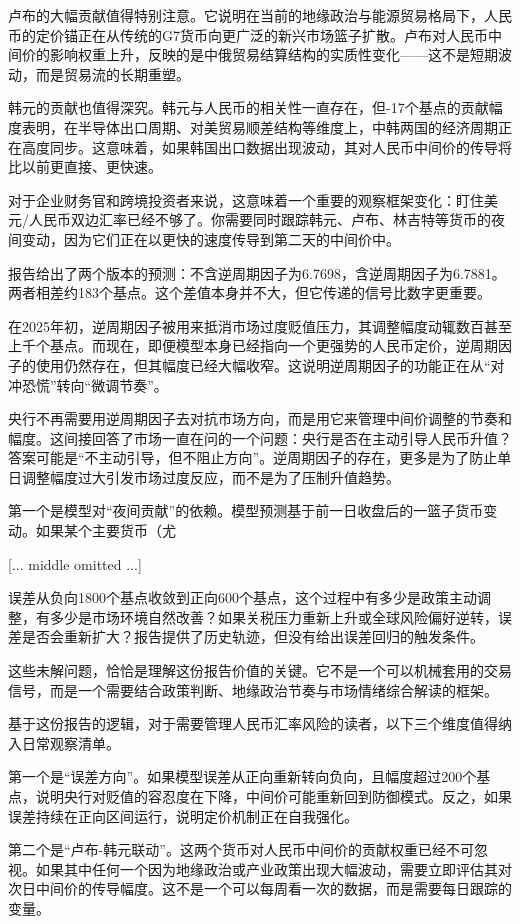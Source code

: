 \documentclass[11pt]{ctexart}
\begin{document}
卢布的大幅贡献值得特别注意。它说明在当前的地缘政治与能源贸易格局下，人民币的定价锚正在从传统的G7货币向更广泛的新兴市场篮子扩散。卢布对人民币中间价的影响权重上升，反映的是中俄贸易结算结构的实质性变化——这不是短期波动，而是贸易流的长期重塑。

韩元的贡献也值得深究。韩元与人民币的相关性一直存在，但-17个基点的贡献幅度表明，在半导体出口周期、对美贸易顺差结构等维度上，中韩两国的经济周期正在高度同步。这意味着，如果韩国出口数据出现波动，其对人民币中间价的传导将比以前更直接、更快速。

对于企业财务官和跨境投资者来说，这意味着一个重要的观察框架变化：盯住美元/人民币双边汇率已经不够了。你需要同时跟踪韩元、卢布、林吉特等货币的夜间变动，因为它们正在以更快的速度传导到第二天的中间价中。

报告给出了两个版本的预测：不含逆周期因子为6.7698，含逆周期因子为6.7881。两者相差约183个基点。这个差值本身并不大，但它传递的信号比数字更重要。

在2025年初，逆周期因子被用来抵消市场过度贬值压力，其调整幅度动辄数百甚至上千个基点。而现在，即便模型本身已经指向一个更强势的人民币定价，逆周期因子的使用仍然存在，但其幅度已经大幅收窄。这说明逆周期因子的功能正在从“对冲恐慌”转向“微调节奏”。

央行不再需要用逆周期因子去对抗市场方向，而是用它来管理中间价调整的节奏和幅度。这间接回答了市场一直在问的一个问题：央行是否在主动引导人民币升值？答案可能是“不主动引导，但不阻止方向”。逆周期因子的存在，更多是为了防止单日调整幅度过大引发市场过度反应，而不是为了压制升值趋势。

第一个是模型对“夜间贡献”的依赖。模型预测基于前一日收盘后的一篮子货币变动。如果某个主要货币（尤

[... middle omitted ...]

误差从负向1800个基点收敛到正向600个基点，这个过程中有多少是政策主动调整，有多少是市场环境自然改善？如果关税压力重新上升或全球风险偏好逆转，误差是否会重新扩大？报告提供了历史轨迹，但没有给出误差回归的触发条件。

这些未解问题，恰恰是理解这份报告价值的关键。它不是一个可以机械套用的交易信号，而是一个需要结合政策判断、地缘政治节奏与市场情绪综合解读的框架。

基于这份报告的逻辑，对于需要管理人民币汇率风险的读者，以下三个维度值得纳入日常观察清单。

第一个是“误差方向”。如果模型误差从正向重新转向负向，且幅度超过200个基点，说明央行对贬值的容忍度在下降，中间价可能重新回到防御模式。反之，如果误差持续在正向区间运行，说明定价机制正在自我强化。

第二个是“卢布-韩元联动”。这两个货币对人民币中间价的贡献权重已经不可忽视。如果其中任何一个因为地缘政治或产业政策出现大幅波动，需要立即评估其对次日中间价的传导幅度。这不是一个可以每周看一次的数据，而是需要每日跟踪的变量。
\end{document}
